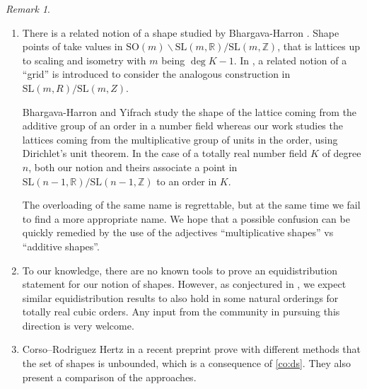 \documentclass[11pt,letterpaper]{amsart}
\theoremstyle{definition}
\theoremstyle{remark}
\newtheorem{rem}[theorem]{Remark}
\renewcommand{\rm}[1]{\mathrm{#1}}
\newcommand{\bb}[1]{\mathbb{#1}}
\newcommand{\R}{\bb R}
\newcommand{\Z}{\bb Z}
\newcommand{\SL}{\rm{SL}}
\newcommand{\SO}{\rm{SO}}
\begin{document}
\begin{rem}
\begin{enumerate}
 \item There is a related notion of a shape studied by Bhargava-Harron \cite{bhargava2016equidistribution}. 
 Shape points of \cite{bhargava2016equidistribution} take values in $\SO(m)\backslash \SL(m,\R) / \SL(m,\Z)$, that is lattices up to scaling and isometry with $m$ being $\deg K-1$. 
 In \cite{yifrach2026equidistribution}, a related notion of a ``grid'' is introduced to consider the analogous construction in $\SL(m,R) / \SL(m,Z)$. %
 
 
Bhargava-Harron and Yifrach study the shape of the lattice coming from the additive group of an order in a number field whereas our work studies the lattices coming from the multiplicative group of units in the order, using Dirichlet's unit theorem. 
In the case of a totally real number field $K$ of degree $n$, both our notion and theirs associate a point in $\SL(n-1,\R)/\SL(n-1,\Z)$ to an order in $K$.   

The overloading of the same name is regrettable, but at the same time we fail to find a more appropriate name. We hope that a possible confusion can be quickly
remedied by the use of the adjectives ``multiplicative shapes'' vs ``additive shapes''.

\item 
{To our knowledge, there are no known tools to prove an equidistribution statement for our notion of shapes. 
However, as conjectured in \cite{mathoverflow_disc}, we expect similar equidistribution results to also hold in some natural orderings for totally real cubic orders.}
{Any input from the community in pursuing this direction is very welcome.}

\item {Corso--Rodriguez Hertz in a recent preprint \cite{corso2025} prove with different methods that the set of shapes is unbounded, which is a consequence of \cref{co:ds}.
They also present a comparison of the approaches.}
\end{enumerate} 
\end{rem}

	
\end{document}
